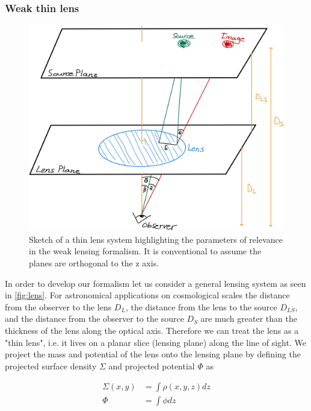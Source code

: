 \subsubsection{Weak thin lens}
\begin{figure}
  \begin{center}
    \includegraphics[width=\textwidth]{figs/lens.jpg}
  \end{center}
  \caption{Sketch of a thin lens system highlighting the parameters of relevance in the weak lensing formalism. It is conventional to assume the planes are orthogonal to the z axis.}
  \label{fig:lens}
\end{figure}
In order to develop our formalism let us consider a general lensing system as seen in \autoref{fig:lens}. For astronomical applications on cosmological scales the distance from the observer to the lens $D_L$, the distance from the lens to the source $D_{LS}$, and the distance from the observer to the source $D_S$ are much greater than the thickness of the lens along the optical axis. Therefore we can treat the lens as a "thin lens", i.e. it lives on a planar slice (lensing plane) along the line of sight. We project the mass and potential of the lens onto the lensing plane by defining the projected surface density $\Sigma$ and projected potential $\Phi$ as

\begin{equation}
  \begin{split}
    \Sigma(x,y) &= \int \rho(x,y,z) dz \\
    \Phi &= \int \phi dz
  \end{split}
  \label{eq:surfacedensity+surfacepot}
\end{equation}

